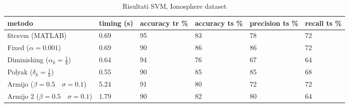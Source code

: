\documentclass[12pt]{extarticle}
\begin{document}
\begin{table}[H]
    \setlength{\tabcolsep}{10pt} %
    \renewcommand{\arraystretch}{1.2} %
    \centering
    \begin{tabular}{ |p{3cm}||p{1.5cm}|p{2cm}|p{2cm}|p{2cm}|p{1.5cm}|  }
    \hline
    metodo & timing (s) & accuracy tr \% & accuracy ts \% & precision ts \% & recall ts \%\\
    \hline
    \hline
    fitcsvm (MATLAB) & 0.69  & 95 & 83 & 78 & 72\\
    \hline
    \hline
    Fixed ($\alpha = 0.001$) & 0.69 & 90 & 86 & 86 & 72\\
    \hline
    Diminishing ($\alpha_k = \frac{1}{k}$) & 0.64 & 94 & 76 & 67 & 64\\
    \hline
    Polyak ($\delta_k = \frac{1}{k}$) & 0.55 & 90 & 85 & 85 & 68\\
    \hline
    Armijo ($\beta = 0.5 \quad \sigma = 0.1$) & 5.24 & 91 & 80 & 72 & 72\\
    \hline
    Armijo 2 ($\beta = 0.5 \quad \sigma = 0.1$) & 1.79 & 90 & 82 & 80 & 64\\
    \hline
    \end{tabular}
    \caption{Risultati SVM, Ionosphere dataset}
    \label{table:svmresults}
\end{table}


\end{document}
